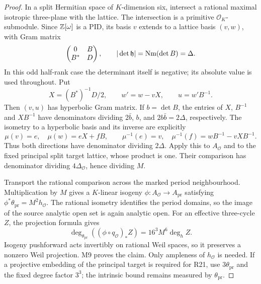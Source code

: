 \documentclass[11pt,a4paper]{article}
\theoremstyle{definition}\newtheorem{definition}[theorem]{Definition}
\theoremstyle{remark}\newtheorem{remark}[theorem]{Remark}
\newcommand{\cO}{\mathcal O}\newcommand{\CH}{\operatorname{CH}}\newcommand{\cl}{\operatorname{cl}}
\begin{document}
\begin{proof}
In a split Hermitian space of $K$-dimension six, intersect a rational
maximal isotropic three-plane with the lattice. The intersection is
a primitive $\cO_K$-submodule. Since $\mathbb Z[\omega]$ is a PID, its basis
$v$ extends to a lattice basis $(v,w)$, with Gram matrix
\[
 \begin{pmatrix}0&B\\B^*&D\end{pmatrix},
 \qquad |\det\mathfrak h|=\operatorname{Nm}(\det B)=\Delta.
\]
In this odd half-rank case the determinant itself is negative; its
absolute value is used throughout. Put
\[
 X=(B^*)^{-1}D/2,\qquad w'=w-vX,\qquad u=w'B^{-1}.
\]
Then $(v,u)$ has hyperbolic Gram matrix. If $b=\det B$, the entries
of $X$, $B^{-1}$ and $XB^{-1}$ have denominators dividing
$2\bar b$, $b$, and $2b\bar b=2\Delta$, respectively.
The isometry to a hyperbolic basis and its inverse are explicitly
\[
 \mu(v)=e,\quad \mu(w)=eX+fB,\qquad
 \mu^{-1}(e)=v,\quad \mu^{-1}(f)=wB^{-1}-vXB^{-1}.
\]
Thus both directions have denominator dividing $2\Delta$.
Apply this to $A_{\cO}$ and to the fixed principal split target
lattice, whose product is one. Their comparison has denominator
dividing $4\Delta_{\cO}$, hence dividing $M$.

Transport the rational comparison across the marked period
neighbourhood. Multiplication by $M$ gives a $K$-linear isogeny
$\phi:A_{\cO}\to A_{\mathrm{pr}}$ satisfying
$\phi^*\theta_{\mathrm{pr}}=M^2h_{\cO}$.
The rational isometry identifies the period domains, so the image
of the source analytic open set is again analytic open.
For an effective three-cycle $Z$, the projection formula gives
\[
 \deg_{\theta_{\mathrm{pr}}}
       ((\phi\circ q_{\cO})_*Z)=16^3M^6\deg_h Z.
\]
Isogeny pushforward acts invertibly on rational Weil spaces, so it
preserves a nonzero Weil projection. M9 proves the claim.
Only ampleness of $h_{\cO}$ is needed. If a projective embedding of
the principal target is required for R21, use $3\theta_{\mathrm{pr}}$
and the fixed degree factor $3^3$; the intrinsic bound remains
measured by $\theta_{\mathrm{pr}}$.
\end{proof}
\end{document}
